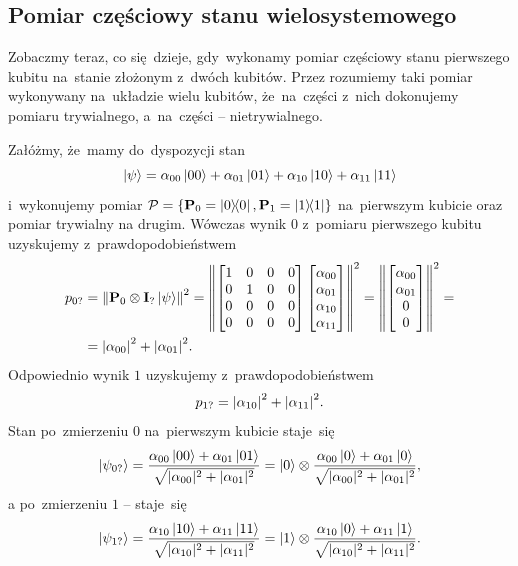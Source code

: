 \subsection{Pomiar częściowy stanu wielosystemowego}
Zobaczmy teraz, co się~dzieje, gdy~wykonamy pomiar częściowy stanu pierwszego
kubitu na~stanie złożonym z~dwóch kubitów. Przez  rozumiemy taki pomiar wykonywany na~układzie
wielu kubitów, że~na~części z~nich dokonujemy pomiaru trywialnego, a~na~części --
nietrywialnego.

Załóżmy, że~mamy do~dyspozycji stan
$$
	\ket{\psi} = \alpha_{00}\ket{00} + \alpha_{01}\ket{01} + \alpha_{10}\ket{10} + \alpha_{11}\ket{11}
$$
i~wykonujemy pomiar $\mathcal{P}=\{\mathbf{P}_0=\ketbra{0}{0},\mathbf{P}_1=\ketbra{1}{1}\}$
na~pierwszym kubicie oraz pomiar trywialny na drugim.
Wówczas wynik $0$ z~pomiaru pierwszego kubitu uzyskujemy z~prawdopodobieństwem
\begin{align*}
	p_{0?} & = \norm{\mathbf{P}_0\otimes\mathbf{I}_? \ket{\psi}}^2 =
	\norm{\begin{bmatrix} 1 & 0 & 0 & 0 \\  0 & 1 & 0 & 0 \\  0 & 0 & 0 & 0 \\  0 & 0 & 0 & 0 \end{bmatrix}
		\begin{bmatrix} \alpha_{00} \\ \alpha_{01} \\ \alpha_{10} \\ \alpha_{11} \end{bmatrix}}^2 =
	\norm{\begin{bmatrix} \alpha_{00} \\ \alpha_{01} \\ 0 \\ 0 \end{bmatrix}}^2  =                       \\
	       & = \abs{\alpha_{00}}^2 + \abs{\alpha_{01}}^2.
\end{align*}
Odpowiednio wynik $1$ uzyskujemy z~prawdopodobieństwem $$p_{1?} = \abs{\alpha_{10}}^2 + \abs{\alpha_{11}}^2.$$
Stan po~zmierzeniu $0$ na~pierwszym kubicie staje~się
$$
	\ket{\psi_{0?}}=
	\frac{\alpha_{00}\ket{00} + \alpha_{01}\ket{01}}{\sqrt{|\alpha_{00}|^2 + |\alpha_{01}|^2}} =
	\ket{0}\otimes\frac{\alpha_{00}\ket{0} + \alpha_{01}\ket{0}}{\sqrt{|\alpha_{00}|^2 + |\alpha_{01}|^2}},
$$
a po~zmierzeniu $1$ -- staje~się
$$
	\ket{\psi_{1?}}=
	\frac{\alpha_{10}\ket{10} + \alpha_{11}\ket{11}}{\sqrt{|\alpha_{10}|^2 + |\alpha_{11}|^2}} =
	\ket{1}\otimes\frac{\alpha_{10}\ket{0} + \alpha_{11}\ket{1}}{\sqrt{|\alpha_{10}|^2 + |\alpha_{11}|^2}}.
$$


